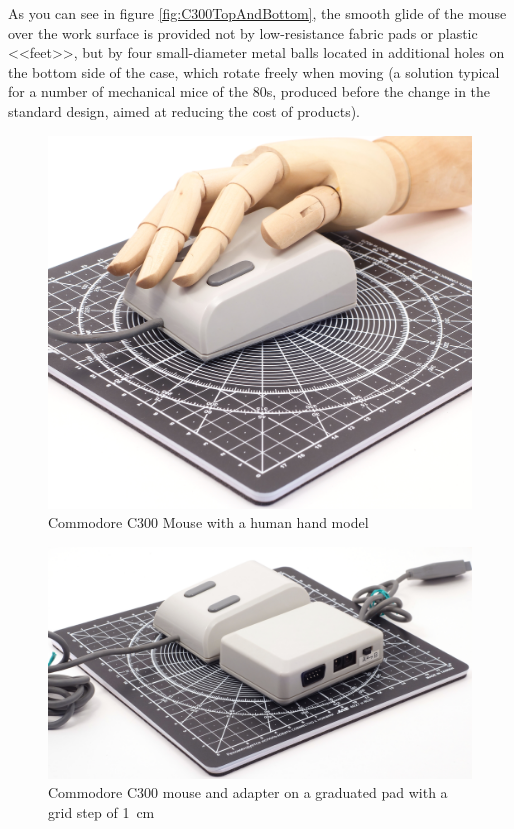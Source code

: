 \documentclass[11pt, a4paper]{article}
\begin{document}
As you can see in figure \ref{fig:C300TopAndBottom}, the smooth glide of the mouse over the work surface is provided not by low-resistance fabric pads or plastic <<feet>>, but by four small-diameter metal balls located in additional holes on the bottom side of the case, which rotate freely when moving (a solution typical for a number of mechanical mice of the 80s, produced before the change in the standard design, aimed at reducing the cost of products).

\begin{figure}[h]
    \centering
    \includegraphics[scale=0.35]{1986_commodore_c300_mouse/cmruka_30.jpg}
    \caption{Commodore C300 Mouse with a human hand model}
    \label{fig:C300Hand}
\end{figure}

\begin{figure}[h]
    \centering
    \includegraphics[scale=0.3]{1986_commodore_c300_mouse/cmblock_30.jpg}
    \caption{Commodore C300 mouse and adapter on a graduated pad with a grid step of 1~cm}
    \label{fig:C300Block}
\end{figure}
\end{document}
